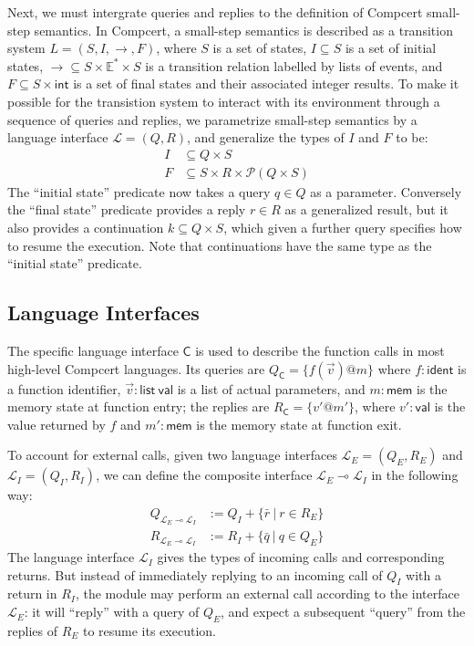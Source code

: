 \documentclass[11pt]{article}
\newcommand{\kw}[1]{{\mathsf{#1}}}
\begin{document}
Next, we must intergrate queries and replies to
the definition of Compcert small-step semantics.
In Compcert, a small-step semantics is described as
a transition system $L = (S, I, \rightarrow, F)$, where
$S$ is a set of states,
$I \subseteq S$ is a set of initial states,
${\rightarrow} \subseteq S \times \mathbb{E}^* \times S$
is a transition relation labelled by lists of events, and
$F \subseteq S \times \kw{int}$ is a set of final states
and their associated integer results.
To make it possible for the transistion system to
interact with its environment
through a sequence of queries and replies,
we parametrize small-step semantics by
a language interface $\mathcal{L} = (Q, R)$,
and generalize the types of $I$ and $F$ to be:
\begin{align*}
  I &\subseteq Q \times S \\
  F &\subseteq S \times R \times \mathcal{P}(Q \times S)
\end{align*}
The ``initial state'' predicate
now takes a query $q \in Q$ as a parameter.
Conversely the ``final state'' predicate
provides a reply $r \in R$ as a generalized result,
but it also provides a continuation $k \subseteq Q \times S$,
which given a further query specifies how to resume the execution.
Note that continuations
have the same type as the ``initial state'' predicate.

\subsection{Language Interfaces}

The specific language interface $\kw{C}$
is used to describe the function calls in most high-level Compcert languages.
Its queries are $Q_\kw{C} = \{ f(\vec{v})@m \}$
where $f : \kw{ident}$ is a function identifier,
$\vec{v} : \kw{list}\ \kw{val}$ is a list of actual parameters, and
$m : \kw{mem}$ is the memory state at function entry;
the replies are $R_\kw{C} = \{ v'@m' \}$,
where $v' : \kw{val}$ is the value returned by $f$ and
$m' : \kw{mem}$ is the memory state at function exit.

To account for external calls,
given two language interfaces
$\mathcal{L}_E = (Q_E, R_E)$ and
$\mathcal{L}_I = (Q_I, R_I)$,
we can define the composite interface
$\mathcal{L}_E \multimap \mathcal{L}_I$
in the following way:
\begin{align*}
  Q_{\mathcal{L}_E \multimap \mathcal{L}_I} &:=
    Q_I + \{ \bar{r} \:|\: r \in R_E \} \\
  R_{\mathcal{L}_E \multimap \mathcal{L}_I} &:=
    R_I + \{ \bar{q} \:|\: q \in Q_E \}
\end{align*}
The language interface $\mathcal{L}_I$
gives the types of incoming calls and corresponding returns.
But instead of immediately replying to an incoming call of $Q_I$
with a return in $R_I$,
the module may perform an external call
according to the interface $\mathcal{L}_E$:
it will ``reply'' with a query of $Q_E$,
and expect a subsequent ``query'' from the replies of $R_E$
to resume its execution.
\end{document}
